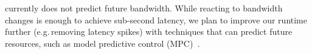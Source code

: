  \sysname{} currently does not predict
future bandwidth. While reacting to bandwidth changes is enough to achieve
sub-second latency, we plan to improve our runtime further (e.g.\,removing
latency spikes) with techniques that can predict future resources, such as model
predictive control (MPC)~\cite{camacho2013model, yin2015control}.


